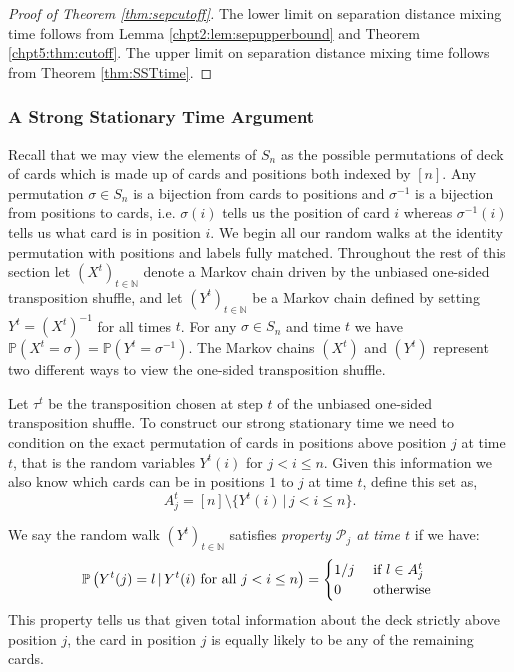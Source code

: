 \documentclass[11pt]{report}
\begin{document}
\begin{proof}[Proof of Theorem \ref{thm:sepcutoff}]
	The lower limit on separation distance mixing time follows from Lemma \ref{chpt2:lem:sepupperbound} and Theorem \ref{chpt5:thm:cutoff}. 
	The upper limit on separation distance mixing time follows from  Theorem 
	\ref{thm:SSTtime}.
	
	
	
	
	
	
	
	
	
\end{proof}


\subsubsection{A Strong Stationary Time Argument}
\label{chpt5:subsec:ostsst}

Recall that we may view the elements of $S_{n}$ as the possible permutations of deck of cards which is made up of cards and positions both indexed by $[n]$. Any permutation $\sigma \in S_{n}$ is a bijection from cards to positions and $\sigma^{-1}$ is a bijection from positions to cards, i.e. $\sigma(i)$ tells us the position of card $i$ whereas $\sigma^{-1}(i)$ tells us what card is in position $i$.  We begin all our random walks at the identity permutation with positions and labels fully matched. Throughout the rest of this section let $(X^{t})_{t\in 	\mathbb{N}}$ denote a Markov chain driven by the unbiased one-sided transposition shuffle, and let $(Y^{t})_{t \in \mathbb{N}}$ be a Markov chain defined by setting $Y^{t} = (X^{t})^{-1}$ for all times $t$. For any $\sigma \in S_{n}$ and time $t$ we have $\mathbb{P}(X^{t} = \sigma) = \mathbb{P}(Y^{t} = \sigma^{-1})$.  The Markov chains $(X^{t})$ and $(Y^{t})$ represent two different ways to view the one-sided transposition shuffle.

Let $\tau^{t}$ be the transposition chosen at step $t$ of the unbiased one-sided transposition shuffle. To construct our strong stationary time we need to condition on the exact permutation of cards in positions above position $j$ at time $t$, that is the random variables $Y^{t}(i)$ for $j< i  \leq n$.
Given this information we also know which cards can be in positions $1$ to $j$ at time $t$, define this set as, 
\[A_{j}^{t} = [n] \setminus \{ Y^{t}(i)  \, | \, j < i \leq n\}.\]

\begin{defn}
	We say the random walk $(Y^{t})_{t\in \mathbb{N}}$ satisfies \emph{property $\mathcal{P}_{j}$ at time $t$} if we have:
	\begin{eqnarray}
	\mathbb{P}\left(Y^{t} (j) = l \, | \, Y^{t}(i) \textnormal{ for all } j < i \leq n \right) = 
	\begin{cases}
	1/j & \textnormal{ if } l \in A_{j}^{t} \\
	0 & \textnormal{ otherwise } 
	\end{cases} \label{chpt5:eqn:propertyj}
	\end{eqnarray} 
	This property tells us that given total information about the deck strictly above position $j$, the card in position $j$ is equally likely to be any of the remaining cards.
\end{defn}
\end{document}
